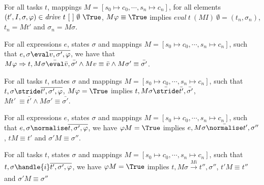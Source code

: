 \begin{theorem}
\label{thm:sound}

For all tasks $t$, mappings $M=[s_0\mapsto c_0,\cdots,s_n\mapsto c_n]$,
for all elements $(t',I,\sigma,\phi)\in \mathit{drive}\ t\ [\ ]\ \emptyset\ \True$,
$M \phi\equiv\True$ implies
$eval\ t\ (M I)\ \emptyset=(t_n,\sigma_n)$,  $t_n=M t'$ and $\sigma_n=M \sigma$.
\end{theorem}

\begin{lemma}
  \label{lem:soundeval}

  For all expressions $e$, states $\sigma$ and mappings $M=[s_0\mapsto c_0,\cdots,s_n\mapsto c_n]$,
  such that $e,\sigma\eval \overline{v,\sigma',\phi}$,
  we have that $M\phi \implies t,M\sigma \bar{\eval}\bar{v},\bar{\sigma'} \land Mv \equiv \bar{v} \wedge M\sigma' \equiv \bar{\sigma'}$.

\end{lemma}

\begin{lemma}
  \label{lem:soundstride}

  For all tasks $t$, states $\sigma$ and mappings $M=[s_0\mapsto c_0,\cdots,s_n\mapsto c_n]$,
  such that $t,\sigma\stride \overline{t',\sigma',\phi}$,
  $M \phi= \True$ implies
  $t,M\sigma \bar{\stride}\bar{t'},\bar{\sigma'}$, $M t'\ \equiv \bar{t'} \land M\sigma' \equiv \bar{\sigma'}$.

\end{lemma}

\begin{lemma}
  \label{lem:soundnorm}

  For all expressions $e$, states $\sigma$ and mappings $M=[s_0\mapsto c_0,\cdots,s_n\mapsto c_n]$,
  such that $e,\sigma\normalise \overline{t,\sigma',\phi}$,
  we have $\phi M =\True$ implies
  $e,M \sigma \bar{\normalise}t',\sigma''$, $t M \equiv t'$ and $\sigma' M \equiv \sigma''$.

\end{lemma}

\begin{lemma}
  \label{lem:soundhandle}

  For all tasks $t$, states $\sigma$ and mappings $M = [s_0\mapsto c_0,\cdots,s_n\mapsto c_n]$,
  such that $t,\sigma\handle{i} \overline{t',\sigma',\phi}$,
  we have $\phi M = \True$ implies
  $t,M \sigma \xrightarrow[]{M i} t'',\sigma''$, $t'M \equiv t'' $ and $\sigma' M \equiv \sigma''$
\end{lemma}

